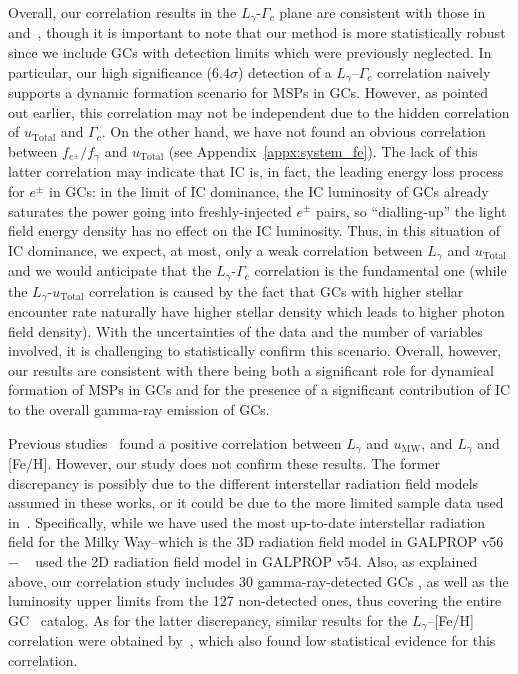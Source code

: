 \documentclass[doublespace,nopageskip]{VTthesis} %
\begin{document}
Overall, our correlation results in the $L_\gamma$-$\Gamma_c$ plane are consistent with those in \citet{2011ApJ...726..100H} and~\citet{2019MNRAS.486..851D}, though it is important to note that our method is more statistically robust since we include GCs with detection limits which were previously neglected. In particular, our high significance ($6.4\sigma$) detection of a $L_\gamma$--$\Gamma_c$ correlation naively supports a dynamic formation scenario for MSPs in GCs. However, as pointed out earlier, this correlation may not be independent due to the hidden correlation of $u_\mathrm{Total}$ and $\Gamma_c$. On the other hand, we have not found an obvious correlation between $f_{e^\pm}/f_\gamma$ and $u_\mathrm{Total}$ (see Appendix~\ref{appx:system_fe}). The lack of this latter correlation may indicate that IC is, in fact, the leading energy loss process for $e^\pm$ in GCs: in the limit of IC dominance, the IC luminosity of GCs already saturates the power going into freshly-injected $e^\pm$ pairs, so ``dialling-up'' the light field energy density has no effect on the IC luminosity. Thus, in this situation of IC dominance, we expect, at most, only a weak correlation between $L_\gamma$ and $u_\mathrm{Total}$ and we would anticipate that the $L_\gamma$-$\Gamma_c$ correlation is the fundamental one (while the $L_\gamma$-$u_\mathrm{Total}$ correlation is caused by the fact that GCs with higher stellar encounter rate naturally have higher stellar density which leads to higher photon field density). With the uncertainties of the data and the number of variables involved, it is challenging to statistically confirm this scenario. Overall, however, our results are consistent with there being both a significant role for dynamical formation of MSPs in GCs and for the presence of a significant contribution of IC to the overall gamma-ray emission of GCs.

Previous studies~\citep{2011ApJ...726..100H} found a positive correlation between $L_\gamma$ and $u_\mathrm{MW}$, and $L_\gamma$ and [Fe/H]. However, our study does not confirm these results. The former discrepancy is possibly due to the different interstellar radiation field models assumed in these works, or it could be due to the more limited sample data used in~\cite{2011ApJ...726..100H}. Specifically, while we have used the most up-to-date interstellar radiation field for the Milky Way--which is the 3D radiation field model in GALPROP v56~\citep{2017ApJ...846...67P}$-$ ~\citet{2011ApJ...726..100H} used the 2D radiation field model in GALPROP v54. Also, as explained above, our correlation study includes 30 gamma-ray-detected GCs , as well as the luminosity upper limits from the 127 non-detected ones, thus covering the entire GC~\citet{1996AJ....112.1487H} catalog. As for the latter discrepancy, similar results for the $L_\gamma$--[Fe/H] correlation were obtained by~\citet{2019MNRAS.486..851D}, which also found low statistical evidence for this correlation.
\end{document}
